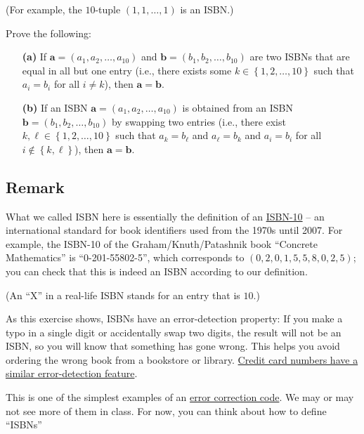 \documentclass[paper=a4, fontsize=12pt]{scrartcl}%
\theoremstyle{plainsl}
\theoremstyle{definition}
\theoremstyle{remark}
\begin{document}
\noindent(For example, the $10$-tuple $\left(  1, 1, \ldots, 1 \right)  $ is
an ISBN.)

Prove the following:

\begin{enumerate}
\item[\textbf{(a)}] If $\mathbf{a} = \left(  a_{1}, a_{2}, \ldots, a_{10}
\right)  $ and $\mathbf{b} = \left(  b_{1}, b_{2}, \ldots, b_{10} \right)  $
are two ISBNs that are equal in all but one entry (i.e., there exists some $k
\in\left\{  1, 2, \ldots, 10 \right\}  $ such that $a_{i} = b_{i}$ for all $i
\neq k$), then $\mathbf{a} = \mathbf{b}$.

\item[\textbf{(b)}] If an ISBN $\mathbf{a} = \left(  a_{1}, a_{2}, \ldots,
a_{10} \right)  $ is obtained from an ISBN $\mathbf{b} = \left(  b_{1}, b_{2},
\ldots, b_{10} \right)  $ by swapping two entries (i.e., there exist $k,
\ell\in\left\{  1, 2, \ldots, 10 \right\}  $ such that $a_{k} = b_{\ell}$ and
$a_{\ell}= b_{k}$ and $a_{i} = b_{i}$ for all $i \notin\left\{  k,
\ell\right\}  $), then $\mathbf{a} = \mathbf{b}$.
\end{enumerate}

\subsection{Remark}

What we called ISBN here is essentially the definition of an
\href{https://en.wikipedia.org/wiki/International_Standard_Book_Number#ISBN-10_check_digits}{ISBN-10}
-- an international standard for book identifiers used from the 1970s until
2007. For example, the ISBN-10 of the Graham/Knuth/Patashnik book ``Concrete
Mathematics'' is ``0-201-55802-5'', which corresponds to $\left(  0, 2, 0, 1,
5, 5, 8, 0, 2, 5 \right)  $; you can check that this is indeed an ISBN
according to our definition.

(An ``X'' in a real-life ISBN stands for an entry that is $10$.)

As this exercise shows, ISBNs have an error-detection property: If you make a
typo in a single digit or accidentally swap two digits, the result will not be
an ISBN, so you will know that something has gone wrong. This helps you avoid
ordering the wrong book from a bookstore or library.
\href{https://en.wikipedia.org/wiki/Luhn_algorithm}{Credit card numbers have a
similar error-detection feature}.

This is one of the simplest examples of an
\href{https://en.wikipedia.org/wiki/Error_correction_code}{error correction
code}. We may or may not see more of them in class. For now, you can think
about how to define ``ISBNs''
\end{document}
